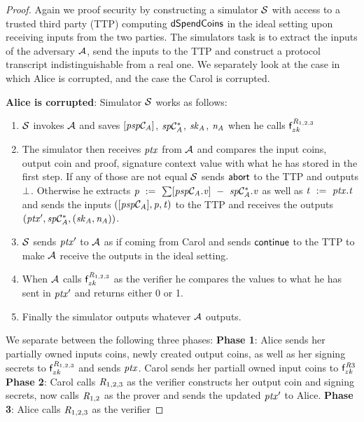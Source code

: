 \begin{proof}
    Again we proof security by constructing a simulator $\mathcal{S}$ with access to a trusted third party (TTP) computing $\mathsf{dSpendCoins}$ in the ideal setting upon receiving inputs from the two parties.
    The simulators task is to extract the inputs of the adversary $\mathcal{A}$, send the inputs to the TTP and construct a protocol transcript indistinguishable from a real one.
    We separately look at the case in which Alice is corrupted, and the case the Carol is corrupted. 

    \textbf{Alice is corrupted}: Simulator $\mathcal{S}$ works as follows:
    \begin{enumerate}
        \item $\mathcal{S}$ invokes $\mathcal{A}$ and saves $[\mathit{psp}\mathcal{C}_{\mathit{A}}]$, $\mathit{sp}\mathcal{C}_{\mathit{A}}^*$, $\mathit{sk}_{\mathit{A}}$, $\mathit{\mathit{n}_{\mathit{A}}}$ when he calls $\mathsf{f}^{\mathit{R}_{1,2,3}}_{zk}$
        \item The simulator then receives $\mathit{ptx}$ from $\mathcal{A}$ and compares the input coins, output coin and proof, signature context value with what he has stored in the first step.
        If any of those are not equal $\mathcal{S}$ sends $\mathsf{abort}$ to the TTP and outputs $\bot$.
        Otherwise he extracts $\mathit{p} ~:=~ \sum [\mathit{psp}\mathcal{C}_{\mathit{A}}.\mathit{v}] ~-~ \mathit{sp}\mathcal{C}_{\mathit{A}}^*.\mathit{v}$ as well as $\mathit{t} ~:=~ \mathit{ptx}.\mathit{t}$ and sends the inputs $([\mathit{psp}\mathcal{C}_{\mathit{A}}], \mathit{p}, \mathit{t})$ to the TTP and receives the outputs $({\mathit{ptx}}', \mathit{sp}\mathcal{C}_{\mathit{A}}^*, (\mathit{sk}_{\mathit{A}}, \mathit{\mathit{n}_{\mathit{A}}}))$.
        \item $\mathcal{S}$ sends ${\mathit{ptx}}'$ to $\mathcal{A}$ as if coming from Carol and sends $\mathsf{continue}$ to the TTP to make $\mathcal{A}$ receive the outputs in the ideal setting.
        \item When $\mathcal{A}$ calls $\mathsf{f}^{\mathit{R}_{1,2,3}}_{zk}$ as the verifier he compares the values to what he has sent in ${\mathit{ptx}}'$ and returns either 0 or 1.
        \item Finally the simulator outputs whatever $\mathcal{A}$ outputs.
    \end{enumerate}
    We separate between the following three phases:
    \textbf{Phase 1}: Alice sends her partially owned inputs coins, newly created output coins, as well as her signing secrets to $\mathsf{f}^{\mathit{R}_{1,2,3}}_{zk}$ and sends $\mathit{ptx}$.
    Carol sends her partiall owned input coins to $\mathsf{f}^{\mathit{R}{3}}_{zk}$
    \textbf{Phase 2}: Carol calls $\mathit{R}_{1,2,3}$ as the verifier constructs her output coin and signing secrets, now calls $\mathit{R}_{1,2}$ as the prover and sends the updated ${\mathit{ptx}}'$ to Alice.
    \textbf{Phase 3}: Alice calls $\mathit{R}_{1,2,3}$ as the verifier


\end{proof}
